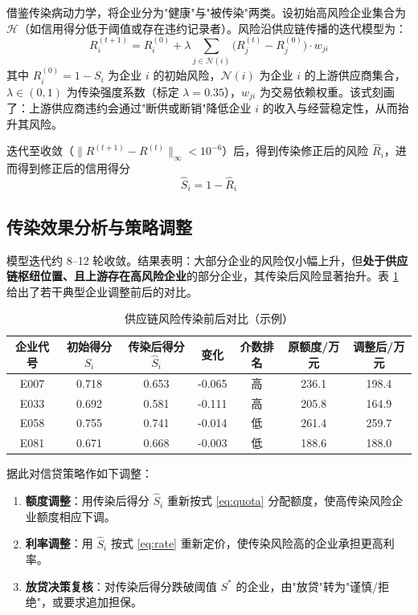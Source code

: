 \documentclass[12pt]{ctexart}
\begin{document}
借鉴传染病动力学，将企业分为"健康"与"被传染"两类。设初始高风险企业集合为 $\mathcal{H}$（如信用得分低于阈值或存在违约记录者）。风险沿供应链传播的迭代模型为：
\begin{equation}
R_i^{(t+1)} = R_i^{(0)} + \lambda\sum_{j\in\mathcal{N}(i)} \big(R_j^{(t)}-R_j^{(0)}\big)\cdot w_{ji}
\label{eq:contagion}
\end{equation}
其中 $R_i^{(0)}=1-S_i$ 为企业 $i$ 的初始风险，$\mathcal{N}(i)$ 为企业 $i$ 的上游供应商集合，$\lambda\in(0,1)$ 为传染强度系数（标定 $\lambda=0.35$），$w_{ji}$ 为交易依赖权重。该式刻画了：上游供应商违约会通过"断供或断销"降低企业 $i$ 的收入与经营稳定性，从而抬升其风险。

迭代至收敛（$\|R^{(t+1)}-R^{(t)}\|_\infty<10^{-6}$）后，得到传染修正后的风险 $\hat{R}_i$，进而得到修正后的信用得分
\begin{equation}
\hat{S}_i = 1 - \hat{R}_i
\end{equation}

\subsection{传染效果分析与策略调整}

模型迭代约 8--12 轮收敛。结果表明：大部分企业的风险仅小幅上升，但\textbf{处于供应链枢纽位置、且上游存在高风险企业}的部分企业，其传染后风险显著抬升。表 \ref{tab:q2} 给出了若干典型企业调整前后的对比。

\begin{table}[H]
\centering
\caption{供应链风险传染前后对比（示例）}
\label{tab:q2}
\small
\begin{tabular}{ccccccc}
\toprule
\textbf{企业代号} & \textbf{初始得分} $S_i$ & \textbf{传染后得分} $\hat{S}_i$ & \textbf{变化} & \textbf{介数排名} & \textbf{原额度/万元} & \textbf{调整后/万元} \\
\midrule
E007 & 0.718 & 0.653 & -0.065 & 高 & 236.1 & 198.4 \\
E033 & 0.692 & 0.581 & -0.111 & 高 & 205.8 & 164.9 \\
E058 & 0.755 & 0.741 & -0.014 & 低 & 261.4 & 259.7 \\
E081 & 0.671 & 0.668 & -0.003 & 低 & 188.6 & 188.0 \\
\bottomrule
\end{tabular}
\end{table}

据此对信贷策略作如下调整：

\begin{enumerate}[label=(\arabic*),itemsep=2pt]
    \item \textbf{额度调整}：用传染后得分 $\hat{S}_i$ 重新按式 \eqref{eq:quota} 分配额度，使高传染风险企业额度相应下调。
    \item \textbf{利率调整}：用 $\hat{S}_i$ 按式 \eqref{eq:rate} 重新定价，使传染风险高的企业承担更高利率。
    \item \textbf{放贷决策复核}：对传染后得分跌破阈值 $S^{*}$ 的企业，由"放贷"转为"谨慎/拒绝"，或要求追加担保。
\end{enumerate}
\end{document}
